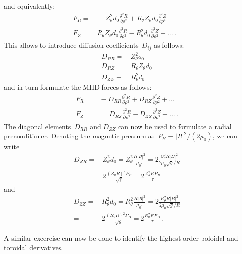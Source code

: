 and equivalently:
\begin{align}
 F_R =&\, - Z_\theta^2        d_0 \frac{\partial^2 R}{\partial \rho^2}
          + R_\theta Z_\theta d_0 \frac{\partial^2 Z}{\partial \rho^2} + ... \\
 F_Z =&\,   R_\theta Z_\theta d_0 \frac{\partial^2 R}{\partial \rho^2}
          - R_\theta^2        d_0 \frac{\partial^2 Z}{\partial \rho^2} + ...  \, .
\end{align}
%
This allows to introduce diffusion coefficients~$D_{ij}$ as follows:
\begin{align}
 D_{RR} =&\, Z_\theta^2        d_0 \\
 D_{RZ} =&\, R_\theta Z_\theta d_0 \\
 D_{ZZ} =&\, R_\theta^2        d_0
\end{align}
and in turn formulate the MHD forces as follows:
\begin{align}
 F_R =&\, - D_{RR} \frac{\partial^2 R}{\partial \rho^2}
          + D_{RZ} \frac{\partial^2 Z}{\partial \rho^2} + ... \\
 F_Z =&\, \phantom{-}\,  D_{RZ} \frac{\partial^2 R}{\partial \rho^2}
          - D_{ZZ} \frac{\partial^2 Z}{\partial \rho^2} + ...  \, .
\end{align}
%
The diagonal elements~$D_{RR}$ and $D_{ZZ}$
can now be used to formulate a radial preconditioner.
%
Denoting the magnetic pressure as~$P_B = |B|^2 / (2 \mu_0)$,
we can write:
\begin{align}
 D_{RR}
 =&\, Z_\theta^2 d_0
 =    Z_\theta^2 \frac{R |B|^2}{\mu_0 \tau}
 =    2 \frac{Z_\theta^2 R |B|^2}{2 \mu_0 \sqrt{g}/R} \nonumber \\
 =&\, 2 \frac{(Z_\theta R)^2 P_B}{\sqrt{g}}
 =    2 \frac{Z_\theta^2 R P_B}{\tau}
\end{align}
and
\begin{align}
 D_{ZZ}
 =&\, R_\theta^2 d_0
 =    R_\theta^2 \frac{R |B|^2}{\mu_0 \tau}
 =    2 \frac{R_\theta^2 R |B|^2}{2 \mu_0 \sqrt{g}/R} \nonumber \\
 =&\, 2 \frac{(R_\theta R)^2 P_B}{\sqrt{g}}
 =    2 \frac{R_\theta^2 R P_B}{\tau} \, .
\end{align}

A similar excercise can now be done to identify
the highest-order poloidal and toroidal derivatives.

